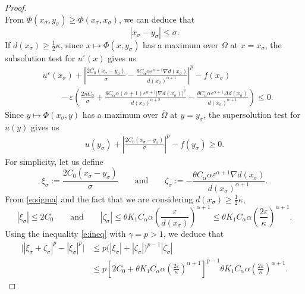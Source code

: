 \documentclass[11pt,reqno]{amsart}
\numberwithin{figure}{section}
\theoremstyle{plain}
\theoremstyle{remark}
\numberwithin{equation}{section}
\begin{document}
\begin{proof}
\begin{equation*}
\end{equation*}
From $\Phi(x_\sigma, y_\sigma) \geq \Phi(x_\sigma, x_\sigma)$, we can deduce that
\begin{equation}\label{e:sigma}
    \left| x_\sigma - y_\sigma \right| \leq \sigma.  
\end{equation}
If $ d(x_\sigma) \geq \frac{1}{2}\kappa$, since $x\mapsto \Phi(x,y_\sigma)$ has a maximum over $\Omega$ at $x=x_\sigma$, the subsolution test for $u^\varepsilon(x)$ gives us
\begin{align}\label{e:subsln}
    &u^\varepsilon(x_\sigma) + \left|\frac{2C_0(x_\sigma - y_\sigma)}{\sigma} -  \frac{\theta C_\alpha\alpha \varepsilon^{\alpha+1} \nabla d(x_\sigma)}{d(x_\sigma)^{\alpha+1}}\right|^p - f(x_\sigma)\nonumber\\
    &\qquad -\varepsilon\left(\frac{2nC_0}{\sigma}+ \frac{\theta C_\alpha\alpha(\alpha+1) \varepsilon^{\alpha+1}|\nabla d(x_\sigma)|^2}{d(x_\sigma)^{\alpha+2}} - \frac{\theta C_\alpha\alpha \varepsilon^{\alpha+1}\Delta d(x_\sigma)}{d(x_\sigma)^{\alpha+1}}\right) \leq 0.
\end{align}
Since $y\mapsto \Phi(x_\sigma,y)$ has a maximum over $\overline{\Omega}$ at $y = y_\sigma$, the supersolution test for $u(y)$ gives us
\begin{align}\label{e:supersln}
    u(y_\sigma) + \left|\frac{2C_0(x_\sigma - y_\sigma)}{\sigma}\right|^p - f(y_\sigma) \geq 0.
\end{align}
For simplicity, let us define
\begin{equation*}
    \xi_\sigma := \frac{2C_0(x_\sigma - y_\sigma)}{\sigma} \qquad\text{and}\qquad \zeta_\sigma :=- \frac{\theta C_\alpha\alpha \varepsilon^{\alpha+1} \nabla d(x_\sigma)}{d(x_\sigma)^{\alpha+1}}.
\end{equation*}
From \eqref{e:sigma} and the fact that we are considering $d(x_\sigma) \geq \frac{1}{2}\kappa$, 
\begin{equation*}
    |\xi_\sigma|\leq 2C_0 \qquad\text{and}\qquad |\zeta_\sigma| \leq \theta K_1 C_\alpha\alpha \left(\frac{\varepsilon}{d(x_\sigma)}\right)^{\alpha+1} \leq \theta K_1 C_\alpha \alpha  \left(\frac{2\varepsilon}{\kappa}\right)^{\alpha+1}.
\end{equation*}
Using the inequality \eqref{e:ineq} with $\gamma = p > 1$, we deduce that
\begin{align}\label{e:estia}
    \Big||\xi_\sigma +\zeta_\sigma|^p - |\xi_\sigma|^p \Big| &\leq p\Big(|\xi_\sigma|+|\zeta_\sigma|\Big)^{p-1}|\zeta_\sigma|\nonumber\\
    &\leq p\left[2C_0+\theta K_1 C_\alpha\alpha \left(\frac{2\varepsilon}{\kappa}\right)^{\alpha+1}\right]^{p-1}\theta K_1 C_\alpha\alpha \left(\frac{2\varepsilon}{\kappa}\right)^{\alpha+1}.

\end{align}
\end{proof}
\end{document}
